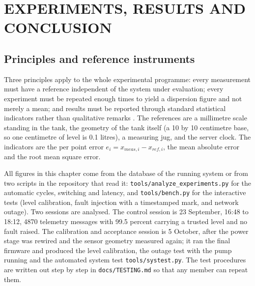 \chapter{EXPERIMENTS, RESULTS AND CONCLUSION}
\label{chap:results}

\section{Principles and reference instruments}
\label{sec:o8-1}

Three principles apply to the whole experimental programme: every measurement must have a reference independent of the system under evaluation; every experiment must be repeated enough times to yield a dispersion figure and not merely a mean; and results must be reported through standard statistical indicators rather than qualitative remarks \cite{bentley2005, jcgm100}. The references are a millimetre scale standing in the tank, the geometry of the tank itself (a 10 by 10 centimetre base, so one centimetre of level is 0.1 litres), a measuring jug, and the server clock. The indicators are the per point error $e_i = x_{meas,i} - x_{ref,i}$, the mean absolute error and the root mean square error.

All figures in this chapter come from the database of the running system or from two scripts in the repository that read it: \texttt{tools/analyze\_experiments.py} for the automatic cycles, switching and latency, and \texttt{tools/bench.py} for the interactive tests (level calibration, fault injection with a timestamped mark, and network outage). Two sessions are analysed. The control session is 23 September, 16:48 to 18:12, 4870 telemetry messages with 99.5 percent carrying a trusted level and no fault raised. The calibration and acceptance session is 5 October, after the power stage was rewired and the sensor geometry measured again; it ran the final firmware and produced the level calibration, the outage test with the pump running and the automated system test \texttt{tools/systest.py}. The test procedures are written out step by step in \texttt{docs/TESTING.md} so that any member can repeat them.

